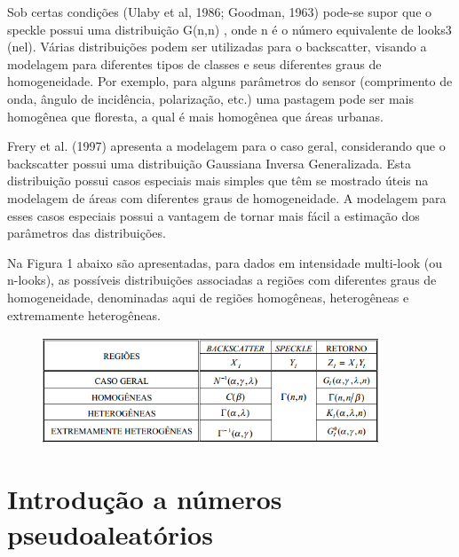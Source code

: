 \documentclass[a4paper, 12pt, english]{article}
\begin{document}
Sob certas condições (Ulaby et al, 1986; Goodman, 1963) pode-se supor que o speckle
possui uma distribuição G(n,n) , onde n é o número equivalente de looks3 (nel). Várias
distribuições podem ser utilizadas para o backscatter, visando a modelagem para diferentes
tipos de classes e seus diferentes graus de homogeneidade. Por exemplo, para alguns
parâmetros do sensor (comprimento de onda, ângulo de incidência, polarização, etc.) uma
pastagem pode ser mais homogênea que floresta, a qual é mais homogênea que áreas
urbanas.

Frery et al. (1997) apresenta a modelagem para o caso geral, considerando que
o backscatter possui uma distribuição Gaussiana Inversa Generalizada. Esta distribuição
possui casos especiais mais simples que têm se mostrado úteis na modelagem de áreas
com diferentes graus de homogeneidade. A modelagem para esses casos especiais possui
a vantagem de tornar mais fácil a estimação dos parâmetros das distribuições.

Na Figura 1 abaixo são apresentadas, para dados em intensidade multi-look (ou n-looks), as
possíveis distribuições associadas a regiões com diferentes graus de homogeneidade,
denominadas aqui de regiões homogêneas, heterogêneas e extremamente heterogêneas.

 \begin{figure}[!ht]
 			\begin{center}
				\includegraphics[width=100mm,scale=0.5]{tabela.png}
			\end{center}
       		\caption{\label{Retorno em intensidade para N - Looks}}
 \end{figure}


\section{Introdução a números pseudoaleatórios}
\end{document}
